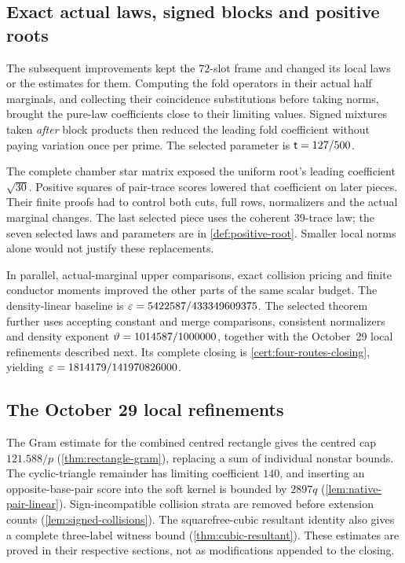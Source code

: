 \subsection{Exact actual laws, signed blocks and positive roots}
\label{subsec:history:oct2425}

The subsequent improvements kept the $72$-slot frame and changed
its local laws or the estimates for them. Computing the fold
operators in their actual half marginals, and collecting their
coincidence substitutions before taking norms, brought the pure-law
coefficients close to their limiting values. Signed mixtures taken
\emph{after} block products then reduced the leading fold coefficient
without paying variation once per prime. The selected parameter is
$\mathsf t=127/500$.

The complete chamber star matrix exposed the uniform root's leading
coefficient $\sqrt{30}$. Positive squares of pair-trace scores lowered
that coefficient on later pieces. Their finite proofs had to control
both cuts, full rows, normalizers and the actual marginal changes.
The last selected piece uses the coherent $39$-trace law; the seven
selected laws and parameters are in \cref{def:positive-root}.
Smaller local norms alone would not justify these replacements.

In parallel, actual-marginal upper comparisons, exact collision
pricing and finite conductor moments improved the other parts of the
same scalar budget. The density-linear baseline is
$\varepsilon=5422587/433349609375$. The selected theorem further uses accepting
constant and merge comparisons, consistent normalizers and density
exponent $\vartheta=1014587/1000000$, together with the
October~29 local refinements described next. Its complete closing is
\cref{cert:four-routes-closing}, yielding
$\varepsilon=1814179/141970826000$.

\subsection{The October 29 local refinements}\label{subsec:history:astra}

The Gram estimate for the combined centred rectangle gives the
centred cap $121.588/p$
(\cref{thm:rectangle-gram}), replacing a sum of individual nonstar
bounds. The cyclic-triangle remainder has limiting coefficient $140$,
and inserting an opposite-base-pair score into the soft kernel
is bounded by $2897q$
(\cref{lem:native-pair-linear}). Sign-incompatible collision strata
are removed before extension counts
(\cref{lem:signed-collisions}). The squarefree-cubic resultant identity
also gives a complete three-label witness bound
(\cref{thm:cubic-resultant}). These estimates are proved in their
respective sections, not as modifications appended to the closing.

